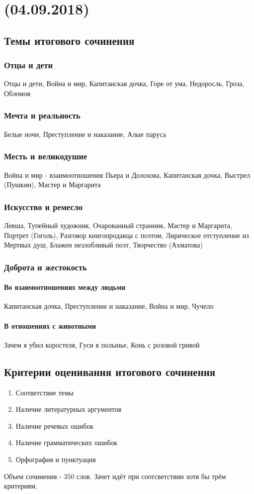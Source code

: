 \documentclass{article}
\author{SDL}
\begin{document}
\noindent\makebox[\linewidth]{\rule{\paperwidth}{0.4pt}}
\section{(04.09.2018)}
\noindent\makebox[\linewidth]{\rule{\paperwidth}{0.4pt}}


\subsection{Темы итогового сочинения}
\subsubsection{Отцы и дети}
Отцы и дети, Война и мир, Капитанская дочка, Горе от ума, Недоросль, Гроза, Обломов
\subsubsection{Мечта и реальность}
Белые ночи, Преступление и наказание, Алые паруса
\subsubsection{Месть и великодушие}
Война и мир - взаимоотношения Пьера и Долохова, Капитанская дочка, Выстрел (Пушкин), Мастер и Маргарита
\subsubsection{Искусство и ремесло}
Левша, Тупейный художник, Очарованный странник, Мастер и Маргарита, Портрет (Гоголь),
Разговор книгопродавца с поэтом, Лирическое отступление из Мертвых душ,
Блажен незлобливый поэт, Творчество (Ахматова)
\subsubsection{Доброта и жестокость}
\paragraph{Во взаимоотношениях между людьми}
Капитанская дочка, Преступление и наказание, Война и мир, Чучело
\paragraph{В отношениях с животными}
Зачем я убил коростеля, Гуси в полынье, Конь с розовой гривой

\subsection{Критерии оценивания итогового сочинения}
\begin{enumerate}
\item
  Соответствие темы
\item
  Наличие литературных аргументов
\item
  Наличие речевых ошибок
\item
  Наличие грамматических ошибок
\item
  Орфография и пунктуация
\end{enumerate}
Объем сочинения - 350 слов.
Зачет идёт при соотсветствии хотя бы трём критериям.
\end{document}
